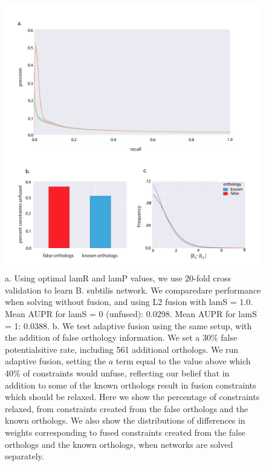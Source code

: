 \documentclass[11pt]{article}
\begin{document}
\begin{figure}
\begin{center}
  \includegraphics[scale=0.45]{fig5_2.pdf}
  \caption{\label{xspecies-real} a. Using optimal lamR and lamP values, we use 20-fold cross validation to learn B. subtilis network. 
  We comparedare performance when solving without fusion, and using L2 fusion with lamS = 1.0. Mean AUPR for lamS = 0 (unfused): 0.0298. 
  Mean AUPR for lamS = 1: 0.0388. b. We test adaptive fusion using the same setup, with the addition of false orthology information.
  We set a 30\% false potentialsitive rate, including 561 additional orthologs. We run adaptive fusion, setting the $a$ term equal to the value above which 40\% of constraints would unfuse, reflecting our belief that in addition to some of the known orthologs result in fusion constraints which should be relaxed. 
  Here we show the percentage of constraints relaxed, from constraints created from the false orthologs and the known orthologs. 
  We also show the distributions of differences in weights corresponding to fused constraints created from the false orthologs and the known orthologs, when networks are solved separately. }
\end{center}
\end{figure}
\end{document}
